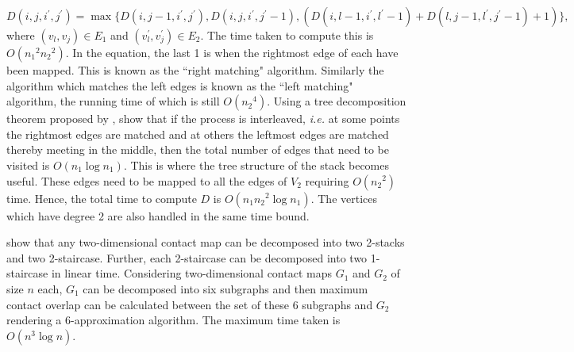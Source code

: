 \begin{equation}
\label{scmo1}
D(i,j,i^{\prime},j^{\prime}) = \max\{D(i,j-1,i^{\prime},j^{\prime}),D(i,j,i^{\prime},j^{\prime}-1),(D(i,l-1,i^{\prime},l^{\prime}-1)
+D(l,j-1,l^{\prime},j^{\prime}-1)+1)\},
\end{equation}
where $(v_l,v_j) \in E_1$ and $(v^{\prime}_l,v^{\prime}_j) \in E_2$. The time taken to compute this is $O({n_1}^2{n_2}^2)$. In the equation, the last 1 is when the rightmost edge of each have been mapped. This is known as the ``right matching" algorithm. Similarly the algorithm which matches the left edges is known as the ``left matching" algorithm, the running time of which is still $O({n_2}^4)$. Using a tree decomposition theorem proposed by \citet{klein98}, \citet{agmw07} show that if the process is interleaved, \emph{i.e.} at some points the rightmost edges are matched and at others the leftmost edges are matched thereby meeting in the middle, then the total number of edges that need to be visited is $O({n_1} \log {n_1})$. This is where the tree structure of the stack becomes useful. These edges need to be mapped to all the edges of $V_2$ requiring $O({n_2}^2)$ time. Hence, the total time to compute $D$ is $O({n_1}{n_2}^2\log n_1)$. The vertices which have degree 2 are also handled in the same time bound.

\citet{goip99} show that any two-dimensional contact map can be decomposed into two 2-stacks and two 2-staircase. Further, each 2-staircase can be decomposed into two 1-staircase in linear time. Considering two-dimensional contact maps $G_1$ and $G_2$ of size $n$ each, $G_1$ can be decomposed into six subgraphs and then maximum contact overlap can be calculated between the set of these $6$ subgraphs and $G_2$ rendering a 6-approximation algorithm. The maximum time taken is $O(n^3\log n)$. 